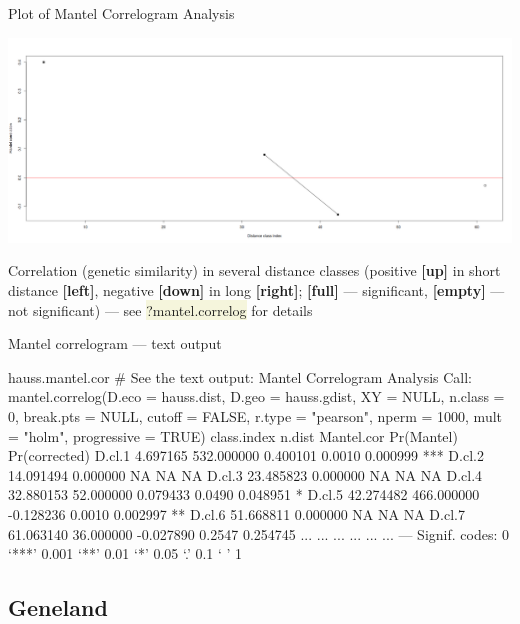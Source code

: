 \documentclass[compress, ucs, xelatex, 11pt, xcolor=svgnames, aspectratio=169,
	hyperref={
		bookmarks=true,
		unicode=true,
		colorlinks=true,
		pdftitle={Molecular data in R},
		plainpages=false,
		pdfauthor={Vojtech Zeisek},
		pdfsubject={Course about phylogeny and evolution in R},
		pdfcreator={XeLaTeX},
		pdfkeywords={R, evolution, phylogeny, molecular data},
		linkcolor=Crimson, %
		anchorcolor=Magenta, %
		citecolor=Magenta, %
		filecolor=Magenta, %
		menucolor=Magenta, %
		urlcolor=DodgerBlue, %
		pdftex},
	url={hyphens, lowtilde} %
	]{beamer}
\renewcommand{\texttt}[1]{\colorbox{Beige}{{\ttfamily #1}}}
\begin{document}
\begin{frame}{Plot of Mantel Correlogram Analysis}
	\vfil
	\begin{center}
		\includegraphics[width=\textwidth-4cm]{mantel-cor.png}
	\end{center}
	\vfil
	Correlation (genetic similarity) in several distance classes (positive \textbf{[up]} in short distance \textbf{[left]}, negative \textbf{[down]} in long \textbf{[right]}; \textbf{[full]} --- significant, \textbf{[empty]} --- not significant) --- see \texttt{?mantel.correlog} for details
	\vfill
\end{frame}

\begin{frame}[fragile]{Mantel correlogram --- text output}
	\begin{spluscode}
    hauss.mantel.cor # See the text output:
    Mantel Correlogram Analysis
    Call:
    mantel.correlog(D.eco = hauss.dist, D.geo = hauss.gdist, XY = NULL,
      n.class = 0, break.pts = NULL, cutoff = FALSE, r.type = "pearson",
      nperm = 1000, mult = "holm", progressive = TRUE)
            class.index     n.dist Mantel.cor Pr(Mantel) Pr(corrected)
    D.cl.1     4.697165 532.000000   0.400101     0.0010      0.000999 ***
    D.cl.2    14.091494   0.000000         NA         NA            NA
    D.cl.3    23.485823   0.000000         NA         NA            NA
    D.cl.4    32.880153  52.000000   0.079433     0.0490      0.048951 *
    D.cl.5    42.274482 466.000000  -0.128236     0.0010      0.002997 **
    D.cl.6    51.668811   0.000000         NA         NA            NA
    D.cl.7    61.063140  36.000000  -0.027890     0.2547      0.254745
       ...          ...        ...        ...        ...           ...
    ---
    Signif. codes:  0 ‘***’ 0.001 ‘**’ 0.01 ‘*’ 0.05 ‘.’ 0.1 ‘ ’ 1
	\end{spluscode}
\end{frame}

\subsection{Geneland}
\end{document}

